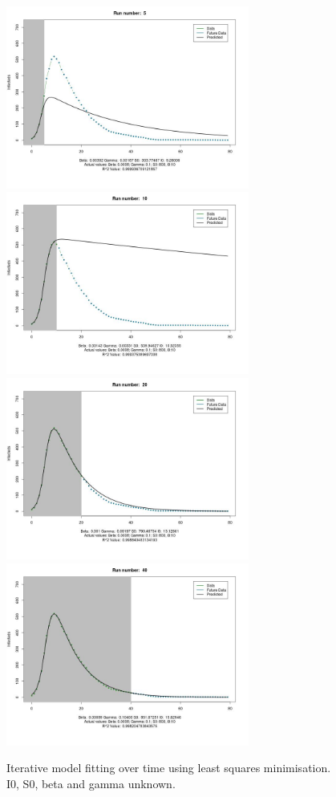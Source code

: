 \begin{centering}
\begin{figure}
\includegraphics[width=8cm]{images/siri0_5}
\includegraphics[width=8cm]{images/siri0_10}
\includegraphics[width=8cm]{images/siri0_20}
\includegraphics[width=8cm]{images/siri0_40}
\caption{Iterative model fitting over time using least squares
  minimisation. I0, S0, beta and gamma unknown.}
\label{fig:siri0}
\end{figure}
\end{centering}


